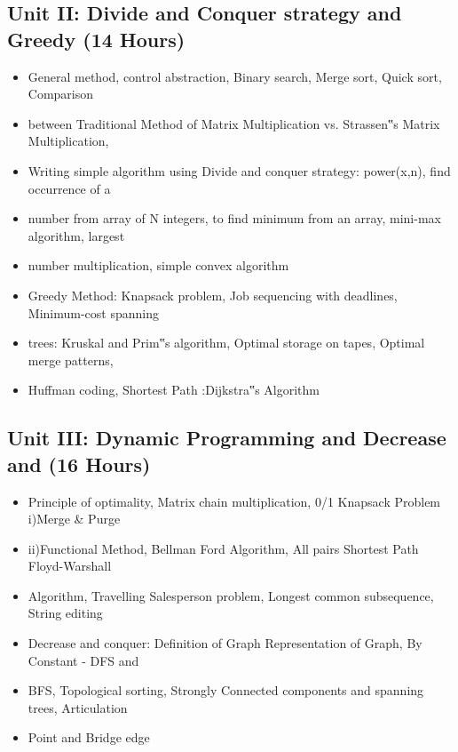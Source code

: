 \documentclass[12pt,a4paper]{article}%
\begin{document}
%
\subsection{Unit II: Divide and Conquer strategy and Greedy (14 Hours)}%
\label{subsec:UnitIIDivideandConquerstrategyandGreedy(14Hours)}%
\begin{itemize}%
\item General method, control abstraction, Binary search, Merge sort, Quick sort, Comparison%
\item between Traditional Method of Matrix Multiplication vs. Strassen‟s Matrix Multiplication,%
\item Writing simple algorithm using Divide and conquer strategy: power(x,n), find occurrence of a%
\item number from array of N integers, to find minimum from an array, mini-max algorithm, largest%
\item number multiplication, simple convex algorithm%
\item Greedy Method: Knapsack problem, Job sequencing with deadlines, Minimum-cost spanning%
\item trees: Kruskal and Prim‟s algorithm, Optimal storage on tapes, Optimal merge patterns,%
\item Huffman coding, Shortest Path :Dijkstra‟s Algorithm%
\end{itemize}

%
\subsection{Unit III: Dynamic Programming and Decrease and (16 Hours)}%
\label{subsec:UnitIIIDynamicProgrammingandDecreaseand(16Hours)}%
\begin{itemize}%
\item Principle of optimality, Matrix chain multiplication, 0/1 Knapsack Problem i)Merge \& Purge%
\item ii)Functional Method, Bellman Ford Algorithm, All pairs Shortest Path Floyd-Warshall%
\item Algorithm, Travelling Salesperson problem, Longest common subsequence, String editing%
\item Decrease and conquer: Definition of Graph Representation of Graph, By Constant - DFS and%
\item BFS, Topological sorting, Strongly Connected components and spanning trees, Articulation%
\item Point and Bridge edge%
\end{itemize}
\end{document}
